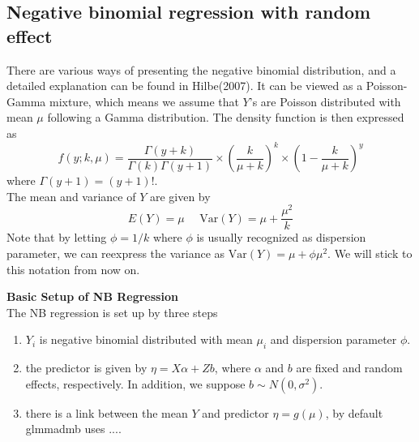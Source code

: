 \documentclass[paper=a4, fontsize=12.5pt]{scrartcl} %
\numberwithin{equation}{section} %
\numberwithin{figure}{section} %
\numberwithin{table}{section} %
\begin{document}
\subsection{Negative binomial regression with random effect}
There are various ways of presenting the negative binomial distribution, and a detailed explanation can be found in Hilbe(2007). It can be viewed as a Poisson-Gamma mixture, which means we assume that $Y$'s are Poisson distributed with mean $\mu$ following a Gamma distribution. The density function is then expressed as
\[f(y; k,\mu)=\frac{\Gamma(y+ k)}{\Gamma(k)\Gamma(y + 1)}\times \left(\frac{k}{\mu + k }\right)^k\times\left(1- \frac{k}{\mu + k }\right)^y\]
where $\Gamma(y+1)=(y+1)!$.\\ The mean and variance of $Y$ are given by
\[E(Y)= \mu  ~~~~~~\text{Var}(Y)=\mu + \frac{\mu^2}{k}\]
Note that by letting $\phi= 1/k$ where $\phi$ is usually recognized as dispersion parameter,  we can reexpress the variance as $\text{Var}(Y)= \mu + \phi\mu^2$. We will stick to this notation from now on.

\textbf{ Basic Setup of NB Regression}\\
The NB regression is set up by three steps
\begin{enumerate}
  \item $Y_i$ is negative binomial distributed with mean $\mu_i$ and dispersion parameter $\phi$.
  \item the predictor is given by $\eta = X\alpha + Zb$, where $\alpha$ and $b$ are fixed and random effects, respectively. In addition, we suppose $b\sim N(0, \sigma^2)$.
  \item there is a link between the mean $Y$ and predictor $\eta = g(\mu)$, by default glmmadmb uses ....
\end{enumerate}
\end{document}

